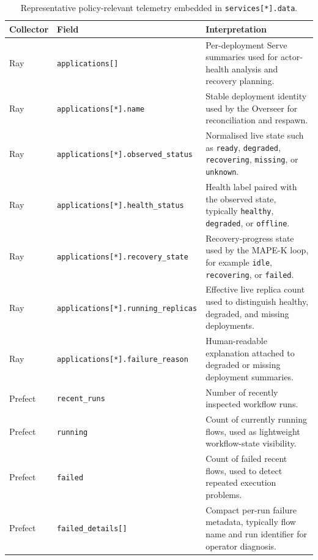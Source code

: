 \documentclass[12pt, a4paper]{report}
\begin{document}
\begin{table}[H]
  \centering
  \caption{Representative policy-relevant telemetry embedded in \texttt{services[*].data}.}
  \label{tab:snapshot_nested_fields}
  \begin{tabularx}{\textwidth}{l l X}
    \toprule
    \textbf{Collector} & \textbf{Field} & \textbf{Interpretation} \\
    \midrule
    Ray & \texttt{applications[]} & Per-deployment Serve summaries used for actor-health analysis and recovery planning. \\
    \addlinespace
    Ray & \texttt{applications[*].name} & Stable deployment identity used by the Overseer for reconciliation and respawn. \\
    \addlinespace
    Ray & \texttt{applications[*].observed\_status} & Normalised live state such as \texttt{ready}, \texttt{degraded}, \texttt{recovering}, \texttt{missing}, or \texttt{unknown}. \\
    \addlinespace
    Ray & \texttt{applications[*].health\_status} & Health label paired with the observed state, typically \texttt{healthy}, \texttt{degraded}, or \texttt{offline}. \\
    \addlinespace
    Ray & \texttt{applications[*].recovery\_state} & Recovery-progress state used by the MAPE-K loop, for example \texttt{idle}, \texttt{recovering}, or \texttt{failed}. \\
    \addlinespace
    Ray & \texttt{applications[*].running\_replicas} & Effective live replica count used to distinguish healthy, degraded, and missing deployments. \\
    \addlinespace
    Ray & \texttt{applications[*].failure\_reason} & Human-readable explanation attached to degraded or missing deployment summaries. \\
    \addlinespace
    Prefect & \texttt{recent\_runs} & Number of recently inspected workflow runs. \\
    \addlinespace
    Prefect & \texttt{running} & Count of currently running flows, used as lightweight workflow-state visibility. \\
    \addlinespace
    Prefect & \texttt{failed} & Count of failed recent flows, used to detect repeated execution problems. \\
    \addlinespace
    Prefect & \texttt{failed\_details[]} & Compact per-run failure metadata, typically flow name and run identifier for operator diagnosis. \\
    \bottomrule
  \end{tabularx}
\end{table}
\end{document}

